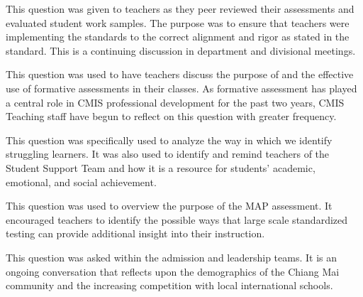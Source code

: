 

This question was given to teachers as they peer reviewed their assessments and evaluated student work samples. The purpose was to ensure that teachers were implementing the standards to the correct alignment and rigor as stated in the standard. This is a continuing discussion in department and divisional meetings.


This question was used to have teachers discuss the purpose of and the effective use of formative assessments in their classes. As formative assessment has played a central role in CMIS professional development for the past two years, CMIS Teaching staff have begun to reflect on this question with greater frequency. 


This question was specifically used to analyze the way in which we identify struggling learners. It was also used to identify and remind teachers of the Student Support Team and how it is a resource for students’ academic, emotional, and social achievement.


This question was used to overview the purpose of the MAP assessment. It encouraged teachers to identify the possible ways that large scale standardized testing can provide additional insight into their instruction. 


This question was asked within the admission and leadership teams. It is an ongoing conversation that reflects upon the demographics of the Chiang Mai community and the increasing competition with local international schools. 
